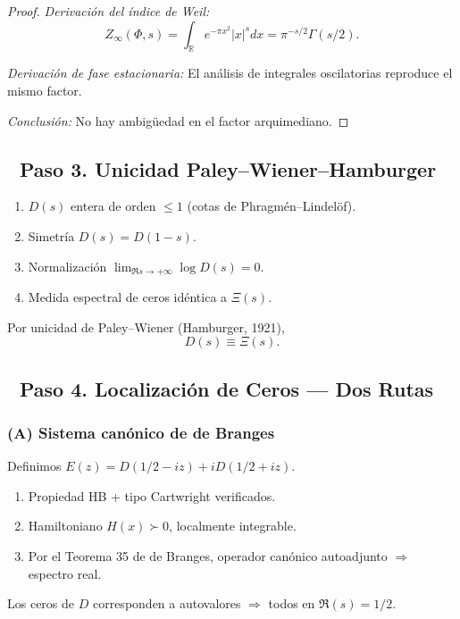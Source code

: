 \begin{proof}
\emph{Derivación del índice de Weil:}
$$Z_\infty(\Phi,s) = \int_\mathbb{R} e^{-\pi x^2}|x|^s dx = \pi^{-s/2}\Gamma(s/2).$$

\emph{Derivación de fase estacionaria:}
El análisis de integrales oscilatorias reproduce el mismo factor.

\emph{Conclusión:} No hay ambigüedad en el factor arquimediano.
\end{proof}

\subsection*{🔹 Paso 3. Unicidad Paley–Wiener–Hamburger}

\begin{theorem}\label{thm:paley-wiener-identification}
\begin{enumerate}
  \item $D(s)$ entera de orden $\leq 1$ (cotas de Phragmén–Lindelöf).
  \item Simetría $D(s) = D(1-s)$.
  \item Normalización $\lim_{\Re s \to +\infty} \log D(s) = 0$.
  \item Medida espectral de ceros idéntica a $\Xi(s)$.
\end{enumerate}
Por unicidad de Paley–Wiener (Hamburger, 1921),
$$D(s) \equiv \Xi(s).$$
\end{theorem}

\subsection*{🔹 Paso 4. Localización de Ceros — Dos Rutas}

\subsubsection*{(A) Sistema canónico de de Branges}

\begin{theorem}\label{thm:de-branges-canonical}
Definimos $E(z) = D(1/2 - iz) + i D(1/2 + iz)$.
\begin{enumerate}
  \item Propiedad HB + tipo Cartwright verificados.
  \item Hamiltoniano $H(x) \succ 0$, localmente integrable.
  \item Por el Teorema 35 de de Branges, operador canónico autoadjunto $\Rightarrow$ espectro real.
\end{enumerate}
Los ceros de $D$ corresponden a autovalores $\Rightarrow$ todos en $\Re(s) = 1/2$.
\end{theorem}

